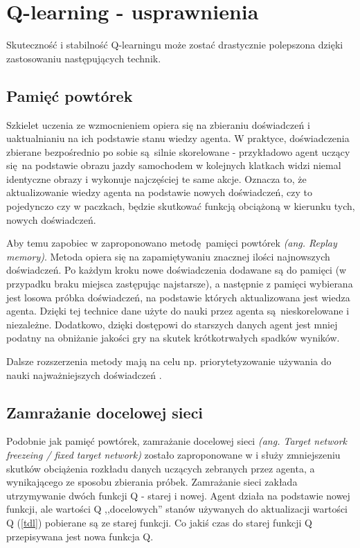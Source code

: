\section{Q-learning - usprawnienia}\label{enhancements}
Skuteczność i stabilność Q-learningu może zostać drastycznie polepszona dzięki zastosowaniu następujących technik.

\subsection{Pamięć powtórek}\label{replaymemory}

Szkielet uczenia ze wzmocnieniem opiera się na zbieraniu doświadczeń i uaktualnianiu na ich podstawie stanu wiedzy agenta. W praktyce, doświadczenia zbierane bezpośrednio po sobie są silnie skorelowane - przykładowo agent uczący się na podstawie obrazu jazdy samochodem w kolejnych klatkach widzi niemal identyczne obrazy i wykonuje najczęściej te same akcje. Oznacza to, że aktualizowanie wiedzy agenta na podstawie nowych doświadczeń, czy to pojedynczo czy w paczkach, będzie skutkować funkcją obciążoną w kierunku tych, nowych doświadczeń.

Aby temu zapobiec w \cite{mnih2015human} zaproponowano metodę pamięci powtórek \textit{(ang. Replay memory)}. Metoda opiera się na zapamiętywaniu znacznej ilości najnowszych doświadczeń. Po każdym kroku nowe doświadczenia dodawane są do pamięci (w przypadku braku miejsca zastępując najstarsze), a następnie z pamięci wybierana jest losowa próbka doświadczeń, na podstawie których aktualizowana jest wiedza agenta. Dzięki tej technice dane użyte do nauki przez agenta są nieskorelowane i niezależne. Dodatkowo, dzięki dostępowi do starszych danych agent jest mniej podatny na obniżanie jakości gry na skutek krótkotrwałych spadków wyników.

Dalsze rozszerzenia metody mają na celu np. priorytetyzowanie używania do nauki najważniejszych doświadczeń \cite{DBLP:journals/corr/SchaulQAS15}.
\subsection{Zamrażanie docelowej sieci}\label{fixedtarget}

Podobnie jak pamięć powtórek, zamrażanie docelowej sieci \textit{(ang. Target network freezeing / fixed target network)} zostało zaproponowane w \cite{mnih2015human} i służy zmniejszeniu skutków obciążenia rozkładu danych uczących zebranych przez agenta, a wynikającego ze sposobu zbierania próbek. Zamrażanie sieci zakłada utrzymywanie dwóch funkcji Q - starej i nowej. Agent działa na podstawie nowej funkcji, ale wartości Q ,,docelowych'' stanów używanych do aktualizacji wartości Q (\ref{tdl}) pobierane są ze starej funkcji. Co jakiś czas do starej funkcji Q przepisywana jest nowa funkcja Q.

